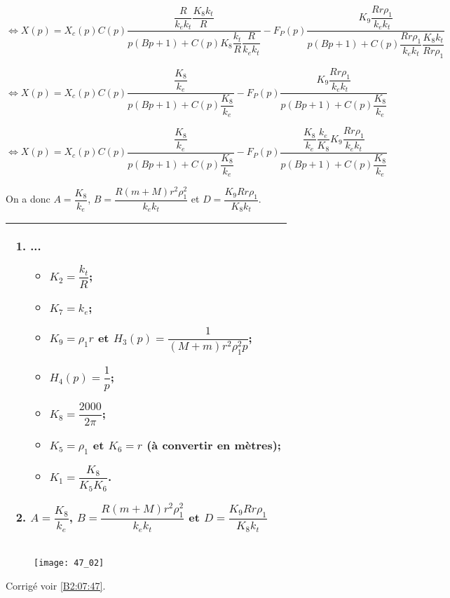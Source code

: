 $\Leftrightarrow X(p)
=
X_c(p) C(p)\dfrac{
\dfrac{R}{k_ek_t}\dfrac{K_8k_t}{R}}{
p\left(B p +  1\right) 
 + C(p)K_8 \dfrac{k_t}{R} \dfrac{R}{k_ek_t}
 }
- F_P(p)\dfrac{K_9\dfrac{Rr\rho_1}{  k_ek_t}}{
p\left(
B  p
 + 1\right)
 + C(p)\dfrac{Rr\rho_1}{  k_ek_t}\dfrac{ K_8 k_t}{Rr\rho_1 } }
$

$\Leftrightarrow X(p)
=
X_c(p) C(p)\dfrac{
\dfrac{K_8}{k_e}}{
p\left(B p +  1\right) 
 + C(p) \dfrac{K_8 }{k_e}
 }
- F_P(p)\dfrac{K_9\dfrac{Rr\rho_1}{  k_ek_t}}{
p\left(
B  p
 + 1\right)
 + C(p)\dfrac{K_8}{  k_e} }
$



$\Leftrightarrow X(p)
=
X_c(p) C(p)\dfrac{
\dfrac{K_8}{k_e}}{
p\left(B p +  1\right) 
 + C(p) \dfrac{K_8 }{k_e}
 }
- F_P(p)\dfrac{ \dfrac{K_8}{  k_e} \dfrac{  k_e}{K_8}K_9\dfrac{Rr\rho_1}{  k_ek_t}}{
p\left(
B  p
 + 1\right)
 + C(p)\dfrac{K_8}{  k_e} }
$



On a donc $A=\dfrac{K_8}{k_e}$, $B=\dfrac{R\left(m+M\right)r^2\rho_1^2}{k_ek_t}$ et 
$D = \dfrac{ K_9 Rr\rho_1}{  K_8k_t}$.
\else
\fi

\ifprof
\else
\footnotesize
\noindent
\begin{tabular}{|p{.8\linewidth}|}
\hline
\begin{enumerate}
\item ...
\begin{itemize}
\item $K_2 = \dfrac{k_t}{R}$;
\item $K_7 = k_e$;
\item $K_9 = \rho_1 r$ et $H_3(p)=\dfrac{1}{\left(M+m\right)r^2\rho_1^2 p}$;
\item $H_4(p)=\dfrac{1}{p}$; 
\item $K_8  = \dfrac{2000}{2\pi}$;
\item $K_5=\rho_1$ et $K_6=r$ (à convertir en mètres);
\item $K_1 =\dfrac{K_8}{K_5 K_6}$.
\end{itemize}
\item $A=\dfrac{K_8}{k_e}$, $B=\dfrac{R\left(m+M\right)r^2\rho_1^2}{k_ek_t}$ et 
$D = \dfrac{ K_9 Rr\rho_1}{  K_8k_t}$
\end{enumerate} \\ \hline
\end{tabular}
\normalsize
\begin{figure}[H]
\centering
\texttt{[image: 47\_02]}
\end{figure}
\fi







\ifprof
\else
\begin{flushright}
\footnotesize{Corrigé  voir \ref{B2:07:47}.}
\end{flushright}%
\fi
